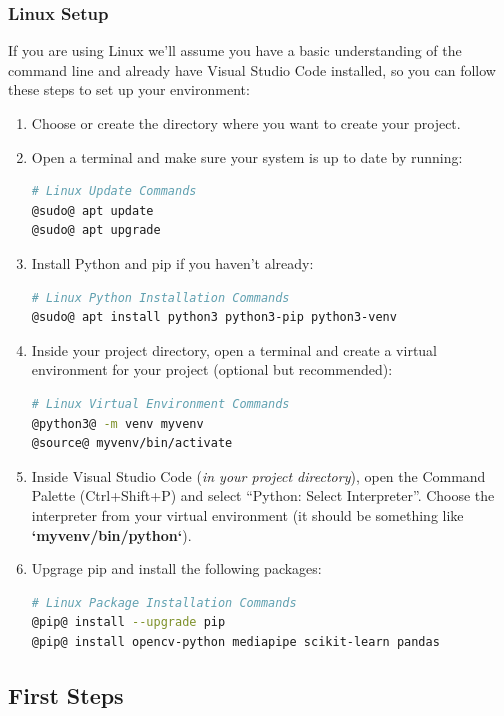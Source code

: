 \subsubsection{Linux Setup}
If you are using Linux we'll assume you have a basic understanding of the command line and already have Visual Studio Code installed, so you can follow these steps to set up your environment:
\begin{enumerate}
    \item Choose or create the directory where you want to create your project.
    \item Open a terminal and make sure your system is up to date by running:
    \begin{lstlisting}[language=bash]
# Linux Update Commands
@sudo@ apt update
@sudo@ apt upgrade
    \end{lstlisting}
    \item Install Python and pip if you haven't already:
    \begin{lstlisting}[language=bash]
# Linux Python Installation Commands
@sudo@ apt install python3 python3-pip python3-venv
    \end{lstlisting}
    \item Inside your project directory, open a terminal and create a virtual environment for your project (optional but recommended):
    \begin{lstlisting}[language=bash, ]
# Linux Virtual Environment Commands
@python3@ -m venv myvenv
@source@ myvenv/bin/activate
    \end{lstlisting}
    \item \sloppy Inside Visual Studio Code (\textit{in your project directory}), open the Command Palette (Ctrl+Shift+P) and select ``Python: Select Interpreter''. Choose the interpreter from your virtual environment (it should be something like \textbf{`myvenv/bin/python`}).
    \item Upgrage pip and install the following packages:
    \begin{lstlisting}[language=bash]
# Linux Package Installation Commands
@pip@ install --upgrade pip
@pip@ install opencv-python mediapipe scikit-learn pandas
    \end{lstlisting}
\end{enumerate}


\subsection{First Steps}

